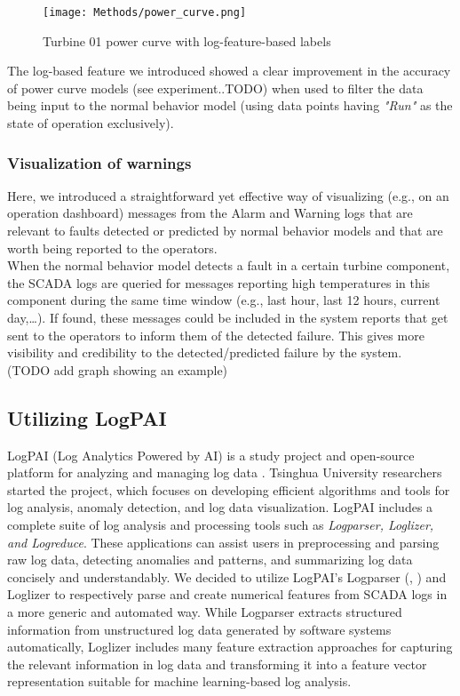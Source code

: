       \begin{figure}[H]
        \begin{center}
          \texttt{[image: Methods/power\_curve.png]}
        \end{center}
        \caption{Turbine 01 power curve with log-feature-based labels}
        \label{fig:power_curve}
      \end{figure}

      The log-based feature we introduced showed a clear improvement in the accuracy of power curve models (see experiment..TODO) when used to filter the data being input 
      to the normal behavior model (using data points having \emph{"Run"} as the state of operation exclusively).

    \subsubsection{Visualization of warnings}
      Here, we introduced a straightforward yet effective way of visualizing (e.g., on an operation dashboard) messages from the Alarm and Warning logs that are relevant 
      to faults detected or predicted by normal behavior models and that are worth being reported to the operators.\\
      When the normal behavior model detects a fault in a certain turbine component, the SCADA logs are queried for messages reporting high temperatures in this component 
      during the same time window (e.g., last hour, last 12 hours, current day,\dots). If found, these messages could be included in the system reports that get sent to the operators
      to inform them of the detected failure. This gives more visibility and credibility to the detected/predicted failure by the system.\\
      (TODO add graph showing an example)
    

  \subsection{Utilizing LogPAI}
    LogPAI (Log Analytics Powered by AI) is a study project and open-source platform for analyzing and managing log data \cite{LogPAI}. 
    Tsinghua University researchers started the project, which focuses on developing efficient algorithms and tools for log analysis, anomaly detection, and log data visualization.
    LogPAI includes a complete suite of log analysis and processing tools such as \emph{Logparser, Loglizer, and Logreduce}. 
    These applications can assist users in preprocessing and parsing raw log data, detecting anomalies and patterns, and summarizing log data concisely and understandably.
    We decided to utilize LogPAI's Logparser (\cite{Logparser_1}, \cite{Logparser_2}) and Loglizer \cite{Loglizer} to respectively parse and create numerical features from 
    SCADA logs in a more generic and automated way. While Logparser extracts structured information from unstructured log data generated by software systems automatically,
    Loglizer includes many feature extraction approaches for capturing the relevant information in log data and transforming it into a feature vector representation suitable 
    for machine learning-based log analysis. \\

